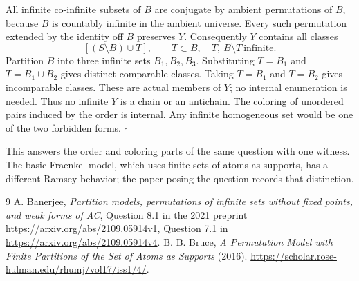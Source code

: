 \documentclass[11pt]{article}
\begin{document}
All infinite co-infinite subsets of $B$ are conjugate by ambient permutations of $B$, because $B$ is countably infinite in the ambient universe. Every such permutation extended by the identity off $B$ preserves $Y$. Consequently $Y$ contains all classes
\[
             [(S\setminus B)\cup T],
             \qquad T\subset B,\quad T,\ B\setminus T\ \text{infinite}.
\]
Partition $B$ into three infinite sets $B_1,B_2,B_3$. Substituting $T=B_1$ and $T=B_1\cup B_2$ gives distinct comparable classes. Taking $T=B_1$ and $T=B_2$ gives incomparable classes. These are actual members of $Y$; no internal enumeration is needed. Thus no infinite $Y$ is a chain or an antichain. The coloring of unordered pairs induced by the order is internal. Any infinite homogeneous set would be one of the two forbidden forms. \hfill$\square$

This answers the order and coloring parts of the same question with one witness. The basic Fraenkel model, which uses finite sets of atoms as supports, has a different Ramsey behavior; the paper posing the question records that distinction.
\begin{thebibliography}{9}
 A. Banerjee, \emph{Partition models, permutations of infinite sets without fixed points, and weak forms of AC}, Question 8.1 in the 2021 preprint \url{https://arxiv.org/abs/2109.05914v1}, Question 7.1 in \url{https://arxiv.org/abs/2109.05914v4}.
 B. B. Bruce, \emph{A Permutation Model with Finite Partitions of the Set of Atoms as Supports} (2016). \url{https://scholar.rose-hulman.edu/rhumj/vol17/iss1/4/}.
\end{thebibliography}
\end{document}
